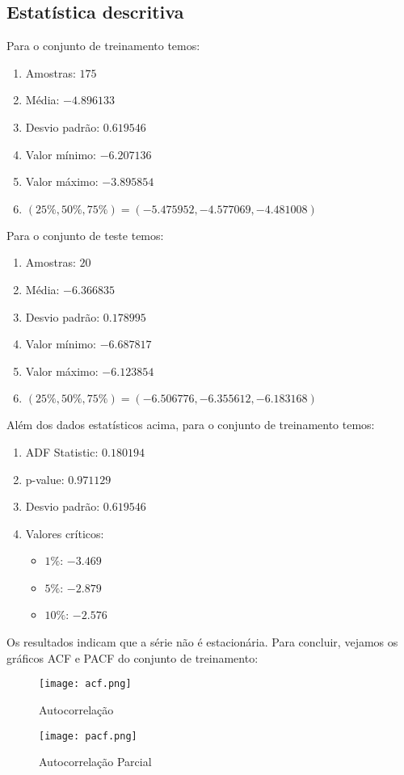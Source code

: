 \documentclass{article}
\begin{document}
\subsection{Estatística descritiva}
Para o conjunto de treinamento temos:
\begin{enumerate}
    \item Amostras: $175$
    \item Média: $-4.896133$
    \item Desvio padrão: $0.619546$
    \item Valor mínimo: $-6.207136$
    \item Valor máximo: $-3.895854$
    \item $(25\%,50\%,75\%) = (-5.475952,-4.577069,-4.481008)$
\end{enumerate}
Para o conjunto de teste temos:
\begin{enumerate}
    \item Amostras: $20$
    \item Média: $-6.366835$
    \item Desvio padrão: $0.178995$
    \item Valor mínimo: $-6.687817$
    \item Valor máximo: $-6.123854$
    \item $(25\%,50\%,75\%) = (-6.506776,-6.355612,-6.183168)$
\end{enumerate}
Além dos dados estatísticos acima, para o conjunto de treinamento temos:
\begin{enumerate}
    \item ADF Statistic: $0.180194$
    \item p-value: $0.971129$
    \item Desvio padrão: $0.619546$
    \item Valores críticos:
    \begin{itemize}
        \item $1\%$: $-3.469$
        \item $5\%$: $-2.879$
        \item $10\%$: $-2.576$
    \end{itemize}
\end{enumerate}
Os resultados indicam que a série não é estacionária. Para concluir, vejamos os gráficos ACF e PACF do conjunto de treinamento:
\begin{figure}[H]
    \centering
    \texttt{[image: acf.png]}
    \caption{Autocorrelação}
\end{figure}
\begin{figure}[H]
    \centering
    \texttt{[image: pacf.png]}
    \caption{Autocorrelação Parcial}
\end{figure}
\end{document}
